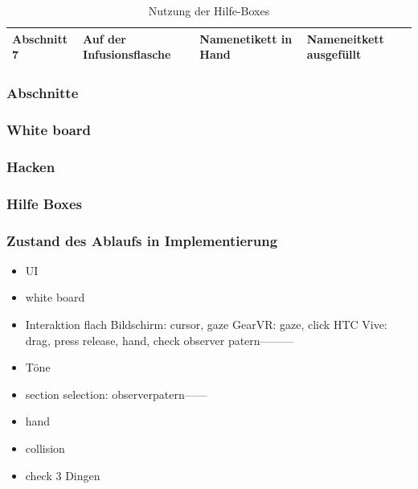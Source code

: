 \begin{itemize}
\begin{table}[]
{\begin{tabular}{llll}
Abschnitt 7 & Auf der Infusionsflasche                                                         & Namenetikett in Hand                                                                                     & Nameneitkett ausgefüllt                                                                                  \\ \hline
\end{tabular}%
}
\caption{Nutzung der Hilfe-Boxes}
\label{my-label}
\end{table}
      
  \end{itemize}
  
  \subsubsection{Abschnitte}
  
  \subsubsection{White board}
  
  \subsubsection{Hacken}
  
  \subsubsection{Hilfe Boxes}
  
  \subsubsection{Zustand des Ablaufs in Implementierung}
  
\begin{itemize}
\item UI
\item white board
\item Interaktion
\subitem flach Bildschirm: cursor, gaze
\subitem GearVR: gaze, click
\subitem HTC Vive: drag, press release, hand, check
\subitem observer patern---------
\item Töne
\item section selection: observerpatern------
\item hand
\item collision
\item check 3 Dingen
\end{itemize}